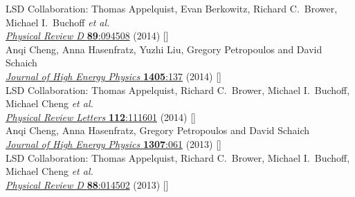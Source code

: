 \begin{spacelist}
\begin{revnumerate}
      LSD Collaboration: Thomas Appelquist, Evan Berkowitz, Richard C.~Brower, Michael I.~Buchoff \textit{et al.} \\ %
      \href{https://doi.org/10.1103/PhysRevD.89.094508}{\textit{Physical Review D} \textbf{89}:094508} (2014) []
    \pagebreakitem
       \\
      Anqi Cheng, Anna Hasenfratz, Yuzhi Liu, Gregory Petropoulos and David Schaich \\
      \href{https://doi.org/10.1007/JHEP05(2014)137}{\textit{Journal of High Energy Physics} \textbf{1405}:137} (2014) []
    \pagebreakitem
       \\
      LSD Collaboration: Thomas Appelquist, Richard C.~Brower, Michael I.~Buchoff, Michael Cheng \textit{et al.} \\ %
      \href{https://doi.org/10.1103/PhysRevLett.112.111601}{\textit{Physical Review Letters} \textbf{112}:111601} (2014) []
    \pagebreakitem
       \\
      Anqi Cheng, Anna Hasenfratz, Gregory Petropoulos and David Schaich \\
      \href{https://doi.org/10.1007/JHEP07(2013)061}{\textit{Journal of High Energy Physics} \textbf{1307}:061} (2013) []
    \pagebreakitem
       \\
      LSD Collaboration: Thomas Appelquist, Richard C.~Brower, Michael I.~Buchoff, Michael Cheng \textit{et al.} \\ %
      \href{https://doi.org/10.1103/PhysRevD.88.014502}{\textit{Physical Review D} \textbf{88}:014502} (2013) []
    \pagebreakitem
       \\

\end{revnumerate}
\end{spacelist}
